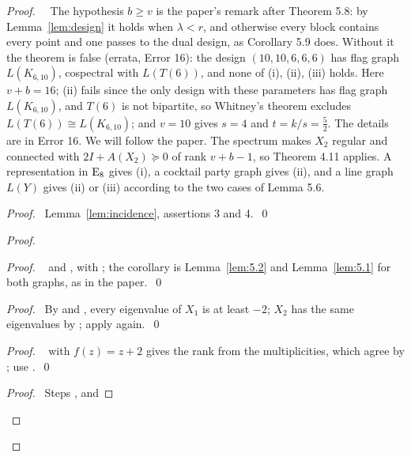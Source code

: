 \begin{proof}
 \pfsketch\ \repair\ The hypothesis $b\ge v$ is the paper's remark after Theorem 5.8: by
 Lemma~\ref{lem:design} it holds when $\lambda<r$, and otherwise every block contains every point
 and one passes to the dual design, as Corollary 5.9 does. Without it the theorem is false
 (errata, Error 16): the design $(10,10,6,6,6)$ has flag graph $L(K_{6,10})$, cospectral with
 $L(T(6))$, and none of (i), (ii), (iii) holds. Here $v+b=16$; (ii) fails since the only design
 with these parameters has flag graph $L(K_{6,10})$, and $T(6)$ is not bipartite, so Whitney's
 theorem excludes $L(T(6))\cong L(K_{6,10})$; and $v=10$ gives $s=4$ and $t=k/s=\frac52$. The
 details are in Error 16. We will follow the paper. The spectrum makes $X_2$
 regular and connected with $2I+A(X_2)\succeq0$ of rank $v+b-1$, so Theorem 4.11 applies. A
 representation in $\mathrm{E}_8$ gives (i), a cocktail party graph gives (ii), and a line graph
 $L(Y)$ gives (ii) or (iii) according to the two cases of Lemma 5.6.
 \begin{proof}\pf\ Lemma~\ref{lem:incidence}, assertions 3 and 4.~\qed\end{proof}
 \begin{proof}
  \begin{proof}\pf\  and , with ; the
   corollary is Lemma~\ref{lem:5.2} and Lemma~\ref{lem:5.1} for both graphs, as in the
   paper.~\qed\end{proof}
  \begin{proof}\pf\ By  and , every eigenvalue of $X_1$ is at
   least $-2$; $X_2$ has the same eigenvalues by ; apply 
   again.~\qed\end{proof}
  \begin{proof}\pf\  with $f(z)=z+2$ gives the rank from the multiplicities,
   which agree by ; use .~\qed\end{proof}
  \qedstep
  \begin{proof}\pf\ Steps ,  and

\end{proof}
\end{proof}
\end{proof}
